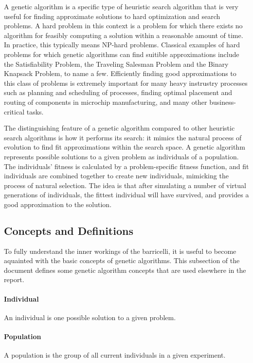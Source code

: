 A genetic algorithm is a specific type of heuristic search algorithm that is very useful for finding approximate solutions to hard optimization and search problems.
A hard problem in this context is a problem for which there exists no algorithm for feasibly computing a solution within a reasonable amount of time.
In practice, this typically means NP-hard problems.
Classical examples of hard problems for which genetic algorithms can find suitible approximations include the Satisfiability Problem, the Traveling Salesman Problem and the Binary Knapsack Problem, to name a few.
Efficiently finding good approximations to this class of problems is extremely important for many heavy instrustry processes such as planning and scheduling of processes, finding optimal placement and routing of components in microchip manufacturing, and many other business-critical tasks.

The distinguishing feature of a genetic algorithm compared to other heuristic search algorithms is how it performs its search: it mimics the natural process of evolution to find fit approximations within the search space.
A genetic algorithm represents possible solutions to a given problem as individuals of a population.
The individuals' fitness is calculated by a problem-specific fitness function, and fit individuals are combined together to create new individuals, mimicking the process of natural selection.
The idea is that after simulating a number of virtual generations of individuals, the fittest individual will have survived, and provides a good approximation to the solution.

\subsection{Concepts and Definitions}

To fully understand the inner workings of the \Gls{barricelli}, it is useful to become aquainted with the basic concepts of genetic algorithms.
This subsection of the document defines some genetic algorithm concepts that are used elsewhere in the report.

\paragraph{Individual}
An individual is one possible solution to a given problem.

\paragraph{Population}
A population is the group of all current individuals in a given experiment.

